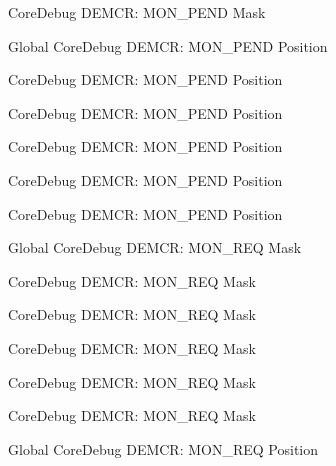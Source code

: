 \begin{DoxyRefList}
\label{deprecated__deprecated000196}%
%
Core\+Debug DEMCR\+: MON\+\_\+\+PEND Mask  
\item[Global \doxylink{group___c_m_s_i_s___core_debug_ga1e2f706a59e0d8131279af1c7e152f8d}{Core\+Debug\+\_\+\+DEMCR\+\_\+\+MON\+\_\+\+PEND\+\_\+\+Pos} ]\label{deprecated__deprecated000195}%
%
Core\+Debug DEMCR\+: MON\+\_\+\+PEND Position 

\label{deprecated__deprecated000337}%
%
Core\+Debug DEMCR\+: MON\+\_\+\+PEND Position 

\label{deprecated__deprecated000502}%
%
Core\+Debug DEMCR\+: MON\+\_\+\+PEND Position 

\label{deprecated__deprecated000413}%
%
Core\+Debug DEMCR\+: MON\+\_\+\+PEND Position 

\label{deprecated__deprecated000051}%
%
Core\+Debug DEMCR\+: MON\+\_\+\+PEND Position 

\label{deprecated__deprecated000604}%
%
Core\+Debug DEMCR\+: MON\+\_\+\+PEND Position  
\item[Global \doxylink{group___c_m_s_i_s___core_debug_gae6384cbe8045051186d13ef9cdeace95}{Core\+Debug\+\_\+\+DEMCR\+\_\+\+MON\+\_\+\+REQ\+\_\+\+Msk} ]\label{deprecated__deprecated000192}%
%
Core\+Debug DEMCR\+: MON\+\_\+\+REQ Mask 

\label{deprecated__deprecated000410}%
%
Core\+Debug DEMCR\+: MON\+\_\+\+REQ Mask 

\label{deprecated__deprecated000499}%
%
Core\+Debug DEMCR\+: MON\+\_\+\+REQ Mask 

\label{deprecated__deprecated000048}%
%
Core\+Debug DEMCR\+: MON\+\_\+\+REQ Mask 

\label{deprecated__deprecated000334}%
%
Core\+Debug DEMCR\+: MON\+\_\+\+REQ Mask 

\label{deprecated__deprecated000601}%
%
Core\+Debug DEMCR\+: MON\+\_\+\+REQ Mask  
\item[Global \doxylink{group___c_m_s_i_s___core_debug_ga341020a3b7450416d72544eaf8e57a64}{Core\+Debug\+\_\+\+DEMCR\+\_\+\+MON\+\_\+\+REQ\+\_\+\+Pos} ]\label{deprecated__deprecated000047}%
%
Core\+Debug DEMCR\+: MON\+\_\+\+REQ Position 


\end{DoxyRefList}
